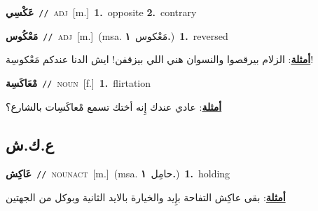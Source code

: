 \documentclass[10pt,a4paper,twoside]{article} %
\begin{document}
\begin{multicols}{2}
{\setlength\topsep{0pt}\textbf{\foreignlanguage{arabic}{عَكْسِي}}\ {\color{gray}\texttt{//}\color{black}}\ \textsc{adj}\ [m.]\ \textbf{1.}~opposite  \textbf{2.}~contrary\ } \vspace{2mm}

{\setlength\topsep{0pt}\textbf{\foreignlanguage{arabic}{مَعْكُوس}}\ {\color{gray}\texttt{//}\color{black}}\ \textsc{adj}\ [m.]\ \color{gray}(msa. \foreignlanguage{arabic}{مَعْكوس}~\foreignlanguage{arabic}{\textbf{١.}})\color{black}\ \textbf{1.}~reversed\  \begin{flushright}\color{gray}\foreignlanguage{arabic}{\textbf{\underline{\foreignlanguage{arabic}{أمثلة}}}: الزلام بيرقصوا والنسوان هني اللي بيزقفن! ايش الدنا عندكم مَعْكوسِة!}\end{flushright}\color{black}} \vspace{2mm}

{\setlength\topsep{0pt}\textbf{\foreignlanguage{arabic}{مْعَاكَسِة}}\ {\color{gray}\texttt{//}\color{black}}\ \textsc{noun}\ [f.]\ \textbf{1.}~flirtation\  \begin{flushright}\color{gray}\foreignlanguage{arabic}{\textbf{\underline{\foreignlanguage{arabic}{أمثلة}}}: عادي عندك إِنه أختك تسمع مْعاكَسِات بالشارع؟}\end{flushright}\color{black}} \vspace{2mm}

\vspace{-3mm}
\subsection*{\color{blue}\foreignlanguage{arabic}{ع.ك.ش}\color{blue}{}} 

{\setlength\topsep{0pt}\textbf{\foreignlanguage{arabic}{عَاكِش}}\ {\color{gray}\texttt{//}\color{black}}\ \textsc{noun\textunderscore act}\ [m.]\ \color{gray}(msa. \foreignlanguage{arabic}{حامِل}~\foreignlanguage{arabic}{\textbf{١.}})\color{black}\ \textbf{1.}~holding\  \begin{flushright}\color{gray}\foreignlanguage{arabic}{\textbf{\underline{\foreignlanguage{arabic}{أمثلة}}}: بقى عاكِش التفاحة بإِيد والخيارة بالايد الثانية وبوكل من الجهتين}\end{flushright}\color{black}} \vspace{2mm}


\end{multicols}
\end{document}
